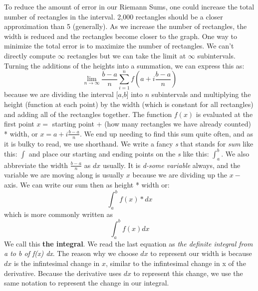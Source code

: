 \documentclass[../revisedmain.tex]{subfiles}
\begin{document}
To reduce the amount of error in our Riemann Sums, one could increase the total number of rectangles in the interval. 2,000 rectangles should be a closer approximation than 5 (generally). As we increase the number of rectangles, the width is reduced and the rectangles become closer to the graph. One way to minimize the total error is to maximize the number of rectangles. We can't directly compute $\infty$ rectangles but we can take the limit at $\infty$ subintervals. Turning the additions of the heights into a summation, we can express this as:$$\lim_{n\to\infty}\frac{b-a}{n}\sum_{i=1}^{n} f\left(a+i\frac{b-a}{n}\right) $$ because we are dividing the interval [$a$,$b$] into $n$ subintervals and multiplying the height (function at each point) by the width (which is constant for all rectangles) and adding all of the rectangles together. The function $f(x)$ is evaluated at the first point $x=$ starting point + (how many rectangles we have already counted) * width, or $x=a+i\displaystyle\frac{b-a}{n}$. We end up needing to find this sum quite often, and as it is bulky to read, we use shorthand. We write a fancy \textit{s} that stands for \textit{sum} like this: $\int$ and place our starting and ending points on the \textit{s} like this: $\displaystyle\int_{a}^{b}$. We also abbreviate the width $\displaystyle\frac{b-a}{n}$ as $dx$ usually. It is \textit{d-some variable} always, and the variable we are moving along is usually $x$ because we are dividing up the $x-$axis. We can write our sum then as height * width or: $$\int_{a}^{b} f(x)*dx$$which is more commonly written as $$\int_{a}^{b}f(x)dx$$ We call this \textbf{the integral}. We read the last equation as \textit{the definite integral from a to b of f(x) dx}. The reason why we choose $dx$ to represent our width is because $dx$ is the infintesimal change in $x$, similar to the infintesimal change in x of the derivative. Because the derivative uses $dx$ to represent this change, we use the same notation to represent the change in our integral.
\end{document}
